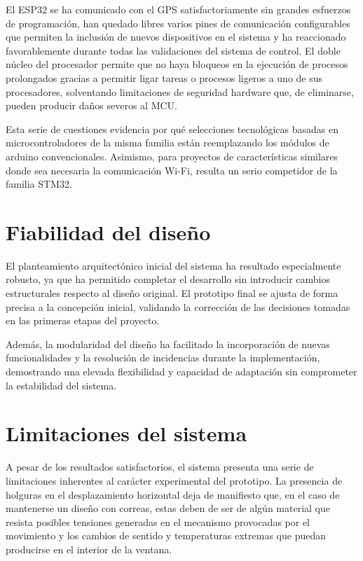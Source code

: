 El ESP32 se ha comunicado con el GPS satisfactoriamente sin grandes esfuerzos de programación, han quedado libres varios pines de comunicación configurables que permiten la inclusión de nuevos dispositivos en el sistema y ha reaccionado favorablemente durante todas las validaciones del sistema de control. El doble núcleo del procesador permite que no haya bloqueos en la ejecución de procesos prolongados gracias a permitir ligar tareas o procesos ligeros a uno de sus procesadores, solventando limitaciones de seguridad hardware que, de eliminarse, pueden producir daños severos al MCU.  

Esta serie de cuestiones evidencia por qué selecciones tecnológicas basadas en microcontroladores de la misma familia están reemplazando los módulos de arduino convencionales. Asimismo, para proyectos de características similares donde sea necesaria la comunicación Wi-Fi, resulta un serio competidor de la familia STM32.

\section{Fiabilidad del diseño}

El planteamiento arquitectónico inicial del sistema ha resultado especialmente robusto, ya que ha permitido completar el desarrollo sin introducir cambios estructurales respecto al diseño original. El prototipo final se ajusta de forma precisa a la concepción inicial, validando la corrección de las decisiones tomadas en las primeras etapas del proyecto.

Además, la modularidad del diseño ha facilitado la incorporación de nuevas funcionalidades y la resolución de incidencias durante la implementación, demostrando una elevada flexibilidad y capacidad de adaptación sin comprometer la estabilidad del sistema.

\section{Limitaciones del sistema}

A pesar de los resultados satisfactorios, el sistema presenta una serie de limitaciones inherentes al carácter experimental del prototipo. La presencia de holguras en el desplazamiento horizontal deja de manifiesto que, en el caso de mantenerse un diseño con correas, estas deben de ser de algún material que resista posibles tensiones generadas en el mecanismo provocadas por el movimiento y los cambios de sentido y temperaturas extremas que puedan producirse en el interior de la ventana. 

